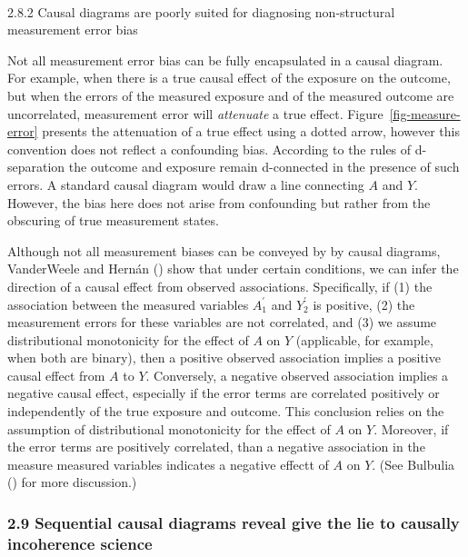 \documentclass[
  singlecolumn]{article}
\makeatletter
\let\oldparagraph\paragraph
\renewcommand{\paragraph}{
    \@ifstar
      \xxxParagraphStar
      \xxxParagraphNoStar
  }
\newcommand{\xxxParagraphStar}[1]{\oldparagraph*{#1}\mbox{}}
\newcommand{\xxxParagraphNoStar}[1]{\oldparagraph{#1}\mbox{}}
\makeatother
\begin{document}
\paragraph{2.8.2 Causal diagrams are poorly suited for diagnosing
non-structural measurement error
bias}\label{causal-diagrams-are-poorly-suited-for-diagnosing-non-structural-measurement-error-bias}

Not all measurement error bias can be fully encapsulated in a causal
diagram. For example, when there is a true causal effect of the exposure
on the outcome, but when the errors of the measured exposure and of the
measured outcome are uncorrelated, measurement error will
\emph{attenuate} a true effect. Figure~\ref{fig-measure-error} presents
the attenuation of a true effect using a dotted arrow, however this
convention does not reflect a confounding bias. According to the rules
of d-separation the outcome and exposure remain d-connected in the
presence of such errors. A standard causal diagram would draw a line
connecting \(A\) and \(Y\). However, the bias here does not arise from
confounding but rather from the obscuring of true measurement states.

Although not all measurement biases can be conveyed by by causal
diagrams, VanderWeele and Hernán
() show that under certain
conditions, we can infer the direction of a causal effect from observed
associations. Specifically, if (1) the association between the measured
variables \(A^{\prime}_{1}\) and \(Y^{\prime}_{2}\) is positive, (2) the
measurement errors for these variables are not correlated, and (3) we
assume distributional monotonicity for the effect of \(A\) on \(Y\)
(applicable, for example, when both are binary), then a positive
observed association implies a positive causal effect from \(A\) to
\(Y\). Conversely, a negative observed association implies a negative
causal effect, especially if the error terms are correlated positively
or independently of the true exposure and outcome. This conclusion
relies on the assumption of distributional monotonicity for the effect
of \(A\) on \(Y\). Moreover, if the error terms are positively
correlated, than a negative association in the measure measured
variables indicates a negative effectt of \(A\) on \(Y\). (See Bulbulia
() for more discussion.)

\subsubsection{2.9 Sequential causal diagrams reveal give the lie to
causally incoherence
science}\label{sequential-causal-diagrams-reveal-give-the-lie-to-causally-incoherence-science}
\end{document}
